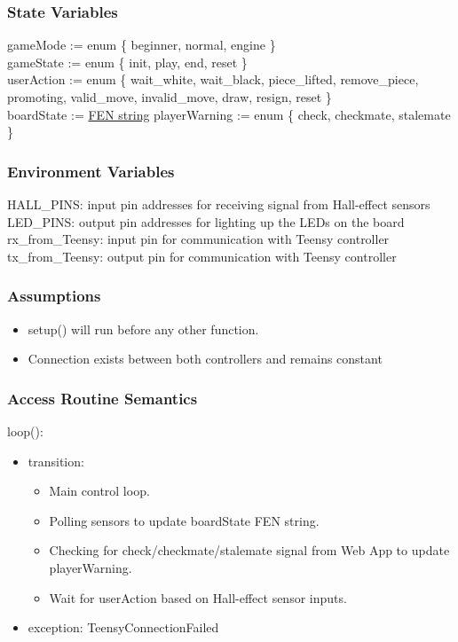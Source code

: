 \documentclass[12pt, titlepage]{article}
\begin{document}
\subsubsection{State Variables}{
  gameMode := enum \{ beginner, normal, engine \}\\
  gameState := enum \{ init, play, end, reset \}\\
  userAction := enum \{ wait\_white, wait\_black, piece\_lifted, remove\_piece, promoting, valid\_move, invalid\_move, draw, resign, reset \}\\
  boardState := \href{https://en.wikipedia.org/wiki/Forsyth%E2%80%93Edwards_Notation}{FEN string}
  playerWarning := enum \{ check, checkmate, stalemate \}\\
}

\subsubsection{Environment Variables}{
  HALL\_PINS: input pin addresses for receiving signal from Hall-effect sensors\\
  LED\_PINS: output pin addresses for lighting up the LEDs on the board\\
  rx\_from\_Teensy: input pin for communication with Teensy controller\\
  tx\_from\_Teensy: output pin for communication with Teensy controller\\
}

\subsubsection{Assumptions}{
  \begin{itemize}
    \item setup() will run before any other function.
    \item Connection exists between both controllers and remains constant
  \end{itemize}
  
}

\subsubsection{Access Routine Semantics}

\noindent loop():
\begin{itemize}
\item transition: \begin{itemize}
  \item Main control loop.
  \item Polling sensors to update boardState FEN string.
  \item Checking for check/checkmate/stalemate signal from Web App to update playerWarning.
  \item Wait for userAction based on Hall-effect sensor inputs.
\end{itemize}
\item exception: TeensyConnectionFailed
\end{itemize}
\end{document}
